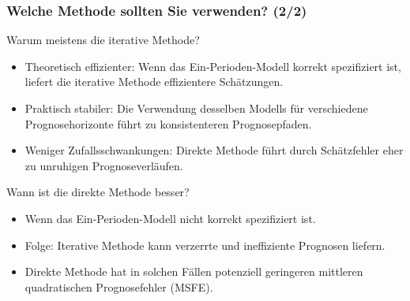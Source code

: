 \documentclass[10pt,aspectratio=169]{beamer}\usepackage[]{graphicx}\usepackage[]{xcolor}
\begin{document}
\begin{frame}
  \frametitle{Welche Methode sollten Sie verwenden? \hfill (2/2)}

  Warum meistens die iterative Methode?
  
  \begin{itemize}
    \item Theoretisch effizienter: Wenn das Ein-Perioden-Modell korrekt spezifiziert ist, liefert die iterative Methode effizientere Schätzungen.
    \item Praktisch stabiler: Die Verwendung desselben Modells für verschiedene Prognosehorizonte führt zu konsistenteren Prognosepfaden.
    \item Weniger Zufallsschwankungen: Direkte Methode führt durch Schätzfehler eher zu unruhigen Prognoseverläufen.
  \end{itemize}
  
  Wann ist die direkte Methode besser?
  
  \begin{itemize}
    \item Wenn das Ein-Perioden-Modell nicht korrekt spezifiziert ist.
    \item Folge: Iterative Methode kann verzerrte und ineffiziente Prognosen liefern.
    \item Direkte Methode hat in solchen Fällen potenziell geringeren mittleren quadratischen Prognosefehler (MSFE).
  \end{itemize}  

\end{frame}



% 
%   
% 
\end{document}
